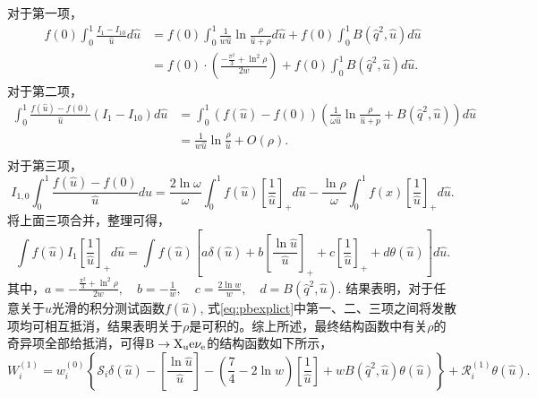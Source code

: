         对于第一项，\begin{equation}
            \begin{aligned}
            f(0) \int_0^1 \frac{I_1-I_{10}}{\hat{u}} d \hat{u} & =f(0) \int_0^1 \frac{1}{w \hat{u}} \ln \frac{\rho}{\hat{u}+\rho} d \hat{u}+f(0) \int_0^1 B\left(\hat{q}^2, \hat{u}\right) d \hat{u} \\
            & =f(0) \cdot\left(\frac{-\frac{\pi^2}{3}+\ln ^2 \rho}{2 w}\right)+f(0) \int_0^1 B\left(\hat{q}^2, \hat{u}\right) d \hat{u}.
            \end{aligned}
            \end{equation}
        对于第二项，
        \begin{equation}
            \begin{aligned}
             \int_0^1 \frac{f(\hat{u})-f(0)}{\hat{u}}\left(I_1-I_{10}\right) d \hat{u}&=\int_0^1(f(\hat{u})-f(0))\left(\frac{1}{\omega \hat{u}} \ln \frac{\rho}{\hat{u}+p}+B\left(\hat{q}^2, \hat{u}\right)\right) d \hat{u} \\
            &=\frac{1}{w \hat{u}} \ln \frac{\rho}{\hat{u}}+O(\rho). \\
            \end{aligned}
            \end{equation}
        对于第三项，
        \begin{equation}
            I_{1,0} \int_0^1 \frac{f(\hat{u})-f(0)}{\hat{u}} d u  =\frac{2 \ln \omega}{\omega} \int_0^1 f(\hat{u})\left[\frac{1}{\hat{u}}\right]_{+} d \hat{u}-\frac{\ln \rho}{\omega} \int_0^1 f(x)\left[\frac{1}{\hat{u}}\right]_{+} d \hat{u}.
            \end{equation}
        将上面三项合并，整理可得，
        \begin{equation}
            \int f(\hat{u}) I_1\left[\frac{1}{\hat{u}}\right]_{+} d \hat{u}=\int f(\hat{u})\left[a \delta(\hat{u})+b\left[\frac{\ln \hat{u}}{\hat{u}}\right]_{+}+c\left[\frac{1}{\hat{u}}\right]_{+}+d \theta(\hat{u})\right] d \hat{u}.
            \end{equation}
        其中，$a=-\frac{\frac{\pi^2}{3}+\ln ^2 \rho}{2 w}, \quad b=-\frac{1}{w}, \quad c=\frac{2 \ln w}{w}, \quad d = B\left(\hat{q}^2, \hat{u}\right)$. 结果表明，对于任意关于$\hat{u}$光滑的积分测试函数$f(\hat{u})$, 式\eqref{eq:pbexplict}中第一、二、三项之间将发散项均可相互抵消，结果表明关于$\rho$是可积的。综上所述，最终结构函数中有关$\rho$的奇异项全部给抵消，可得$\mathrm{B\to X_{u}e\nu_{e}}$的结构函数如下所示，
        \begin{equation}
            W_i^{(1)}=w_i^{(0)}\left\{\mathcal{S}_i \delta(\hat{u})-\left[\frac{\ln \hat{u}}{\hat{u}}\right]-\left(\frac{7}{4}-2 \ln w\right)\left[\frac{1}{\hat{u}}\right]+w B\left(\hat{q}^2, \hat{u}\right) \theta(\hat{u})\right\}+\mathcal{R}_i^{(1)} \theta(\hat{u}).
            \end{equation}
